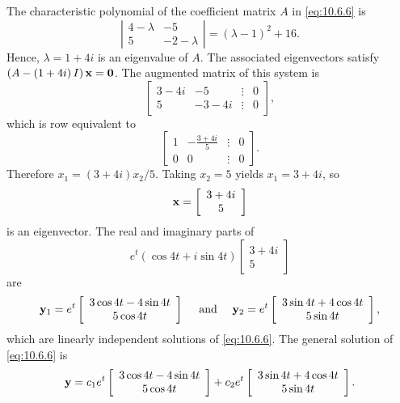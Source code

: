 \begin{examplesolution}
\solution The characteristic polynomial of the coefficient matrix $A$ in \eqref{eq:10.6.6} is
\[
  \left|
  \begin{array}{cc}
    4-\lambda & -5         \\
    5         & -2-\lambda
  \end{array}\right|=(\lambda-1)^{2}+16.
\]
Hence, $\lambda=1+4i$ is an eigenvalue of $A$. The associated eigenvectors satisfy
$\left(A-\left(1+4i\right)I\right){\bf x}={\bf 0}$. The augmented matrix of this system is
\[
  \left[
  \begin{array}{cccr}
    3-4i & -5    & \vdots & 0 \\
    5    & -3-4i & \vdots & 0
  \end{array}\right],
\]
which is row equivalent to
\[
  \left[
  \begin{array}{cccr}
    1 & -\frac{3+4i}{5} & \vdots & 0 \\
    0 & 0               & \vdots & 0
  \end{array}\right].
\]
Therefore $x_{1}=(3+4i)x_{2}/5$. Taking $x_{2}=5$ yields $x_{1}=3+4i$, so
\[
  {\bf x}=\left[
  \begin{array}{c}
    3+4i \\
    5
  \end{array}\right]
\]
is an eigenvector. The real and imaginary parts of
\[
  e^{t}(\cos4t+i\sin4t)\left[
  \begin{array}{c}
    3+4i \\
    5
  \end{array}\right]
\]
are
\[
  {\bf y}_{1}=e^{t}\left[
  \begin{array}{c}
    3\cos4t-4\sin 4t \\
    5\cos4t
  \end{array}\right]\quad\mbox{ and }\quad{\bf y}_{2}=e^{t}\left[
  \begin{array}{c}
    3\sin4t+4\cos4t \\
    5\sin 4t
  \end{array}\right],
\]
which are linearly independent solutions of \eqref{eq:10.6.6}. The general solution of
\eqref{eq:10.6.6} is
\[
  {\bf y}= c_{1}e^{t}\left[
  \begin{array}{c}
    3\cos4t-4\sin 4t \\
    5\cos4t
  \end{array}\right]+ c_{2}e^{t}\left[
  \begin{array}{c}
    3\sin4t+4\cos4t \\
    5\sin 4t
  \end{array}\right].
\]
\end{examplesolution}

